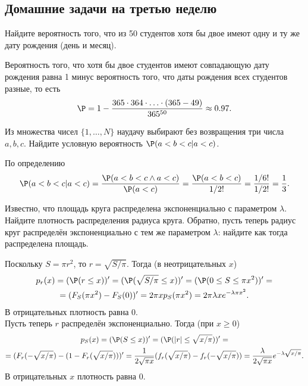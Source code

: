 \subsection{Домашние задачи на третью неделю}
\begin{problem}
    Найдите вероятность того, что из 50 студентов хотя бы двое имеют одну и ту же дату рождения (день и месяц).
\end{problem}
\begin{solution}
    Вероятность того, что хотя бы двое студентов имеют совпадающую дату рождения равна 1 минус вероятность того, что даты рождения всех студентов разные, то есть
    \[
        \P = 1 - \dfrac{365 \cdot 364 \cdot \ldots \cdot (365 - 49)}{365^{50}} \approx 0.97.
    \]
\end{solution}
\begin{problem}
    Из множества чисел $\{1, \ldots, N\}$ наудачу выбирают без возвращения три числа $a, b, c$. Найдите условную вероятность $\P(a < b < c|a < c)$.
\end{problem}
\begin{solution}
    По определению
    \[
        \P(a < b < c|a < c) = \dfrac{\P(a < b < c \wedge a < c)}{\P(a < c)} = \dfrac{\P(a < b < c)}{1/2!} = \dfrac{1/6!}{1/2!} = \dfrac{1}{3}.
    \]
\end{solution}
\begin{problem}
    Известно, что площадь круга распределена экспоненциально с параметром $\lambda$.
    Найдите плотность распределения радиуса круга.
    Обратно, пусть теперь радиус круг распределён экспоненциально с тем же параметром $\lambda$: найдите как тогда распределена площадь.
\end{problem}
\begin{solution}
    Поскольку $S = \pi r^2$, то $r = \sqrt {S/\pi}$.
    Тогда (в неотрицательных $x$)
    \begin{multline*}
        p_r(x) = (\P(r \leq x))' = (\P(\sqrt{S/\pi} \leq x))' = (\P(0 \leq S \leq \pi x^2))' =\\= (F_S(\pi x^2) - F_S(0))' = 2\pi xp_S(\pi x^2) = 2\pi\lambda xe^{-\lambda\pi x^2}.
    \end{multline*}
    В отрицательных плотность равна 0. \\
    Пусть теперь $r$ распределён экспоненциально.
    Тогда (при $x \geq 0$)
    \begin{multline*}
        p_S(x) = (\P(S \leq x))' = (\P(|r| \leq \sqrt{x/\pi}))' =\\=
        (F_r(-\sqrt {x/\pi}) - (1 - F_r(\sqrt {x/\pi})))' = \dfrac{1}{2\sqrt{\pi x}}(f_r(\sqrt{x/\pi}) - f_r(-\sqrt{x/\pi})) = \dfrac{\lambda}{2\sqrt {\pi x}}e^{-\lambda\sqrt {x/\pi}}.
    \end{multline*}
    В отрицательных $x$ плотность равна 0.
\end{solution}
